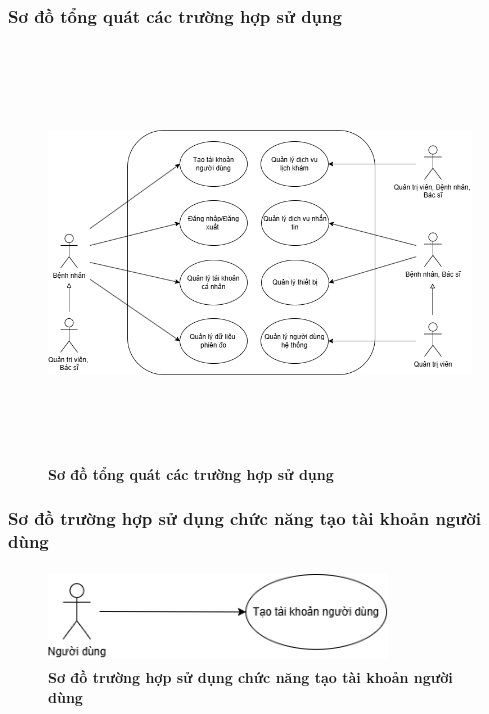 \subsubsection{Sơ đồ tổng quát các trường hợp sử dụng}

\begin{figure}[H]
	\centering
	\includegraphics[width=16cm,height=11cm]{Images/use_case/use_case_general.png}
	\caption[Sơ đồ tổng quát các trường hợp sử dụng của hệ thống]{\bfseries \fontsize{12pt}{0pt}
		\selectfont Sơ đồ tổng quát các trường hợp sử dụng}
	\label{use_case_general} %
\end{figure}

\subsubsection{Sơ đồ trường hợp sử dụng chức năng tạo tài khoản người dùng}

\begin{figure}[H]
	\centering
	\includegraphics[width=9cm,height=2.5cm]{Images/use_case/use_case_register.png}
	\caption[Sơ đồ trường hợp sử dụng chức năng tạo tài khoản người dùng của hệ thống]{\bfseries \fontsize{12pt}{0pt}
		\selectfont Sơ đồ trường hợp sử dụng chức năng tạo tài khoản người dùng}
	\label{use_case_register} %
\end{figure}

